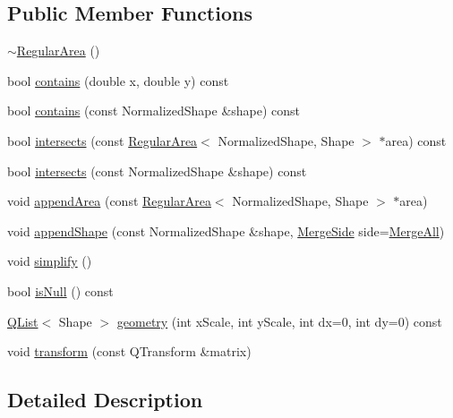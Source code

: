 \subsection*{Public Member Functions}
\begin{DoxyCompactItemize}
\item 
\hyperlink{classOkular_1_1RegularArea_af8c98a98fdbad81ef928b656f7fb1a54}{$\sim$\+Regular\+Area} ()
\item 
bool \hyperlink{classOkular_1_1RegularArea_a0e5880aad001da0b210f80e12627ee71}{contains} (double x, double y) const 
\item 
bool \hyperlink{classOkular_1_1RegularArea_a8d42902a471bab7ec2db4bbc4f5045f2}{contains} (const Normalized\+Shape \&shape) const 
\item 
bool \hyperlink{classOkular_1_1RegularArea_ae0a3d68c548b8e2357753fad9b2d3dfd}{intersects} (const \hyperlink{classOkular_1_1RegularArea}{Regular\+Area}$<$ Normalized\+Shape, Shape $>$ $\ast$area) const 
\item 
bool \hyperlink{classOkular_1_1RegularArea_abd14620771d9920d305dc001aa4f804c}{intersects} (const Normalized\+Shape \&shape) const 
\item 
void \hyperlink{classOkular_1_1RegularArea_ab971287738d6f9c33cdab3f3cfc44cc7}{append\+Area} (const \hyperlink{classOkular_1_1RegularArea}{Regular\+Area}$<$ Normalized\+Shape, Shape $>$ $\ast$area)
\item 
void \hyperlink{classOkular_1_1RegularArea_a04f39bd87b3d075a9b8e8d4a0ee54149}{append\+Shape} (const Normalized\+Shape \&shape, \hyperlink{namespaceOkular_ad98deec425adfb02ba05a78568bccceb}{Merge\+Side} side=\hyperlink{namespaceOkular_ad98deec425adfb02ba05a78568bccceba7721ff1c43048d327e3809bdb53e8b9a}{Merge\+All})
\item 
void \hyperlink{classOkular_1_1RegularArea_a927a93d6884b78f307d28348fde45f73}{simplify} ()
\item 
bool \hyperlink{classOkular_1_1RegularArea_a0bd542cc39a4430c9345bcb7a7d6c44a}{is\+Null} () const 
\item 
\hyperlink{classQList}{Q\+List}$<$ Shape $>$ \hyperlink{classOkular_1_1RegularArea_a11102f819377bbe801f561afda89640e}{geometry} (int x\+Scale, int y\+Scale, int dx=0, int dy=0) const 
\item 
void \hyperlink{classOkular_1_1RegularArea_a38570778d6e7f984a3b3b7724e69ab10}{transform} (const Q\+Transform \&matrix)
\end{DoxyCompactItemize}


\subsection{Detailed Description}
